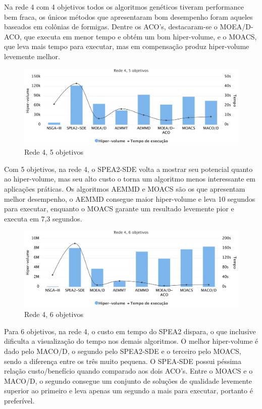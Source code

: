 Na rede 4 com 4 objetivos todos os algoritmos genéticos tiveram performance bem fraca, os únicos métodos que apresentaram bom desempenho foram aqueles baseados em colônias de formigas. Dentre os ACO's, destacaram-se o MOEA/D-ACO, que executa em menor tempo e obtém um bom hiper-volume, e o MOACS, que leva mais tempo para executar, mas em compensação produz hiper-volume levemente melhor.

\begin{figure}[!htbp]
	\caption{Rede 4, 5 objetivos}
	\label{fig_exp4_r4o5}
	\includegraphics[width=1\textwidth]{cap_experimentos/figs/etapa4/r4o5}
\end{figure}

Com 5 objetivos, na rede 4, o SPEA2-SDE volta a mostrar seu potencial quanto ao hiper-volume, mas seu alto custo o torna um algoritmo menos interessante em aplicações práticas. Os algoritmos AEMMD e MOACS são os que apresentam melhor desempenho, o AEMMD consegue maior hiper-volume e leva 10 segundos para executar, enquanto o MOACS garante um resultado levemente pior e executa em 7,3 segundos.

\begin{figure}[!htbp]
	\caption{Rede 4, 6 objetivos}
	\label{fig_exp4_r4o6}
	\includegraphics[width=1\textwidth]{cap_experimentos/figs/etapa4/r4o6}
\end{figure}

Para 6 objetivos, na rede 4, o custo em tempo do SPEA2 dispara, o que inclusive dificulta a visualização do tempo nos demais algoritmos. O melhor hiper-volume é dado pelo MACO/D, o segundo pelo SPEA2-SDE e o terceiro pelo MOACS, sendo a  diferença entre os três muito pequena. O SPEA-SDE possui péssima relação custo/benefício quando comparado aos dois ACO's. Entre o MOACS e o MACO/D, o segundo consegue um conjunto de soluções de qualidade levemente superior ao primeiro e leva apenas um segundo a mais para executar, portanto é preferível.

